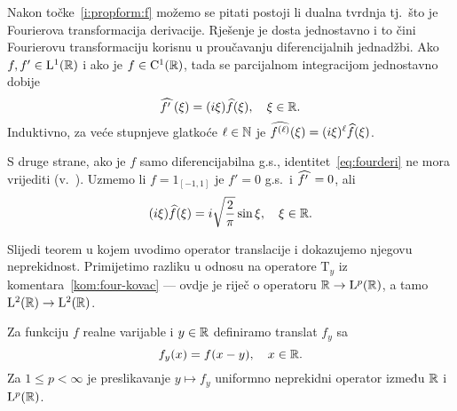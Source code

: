 \documentclass[main.tex]{subfiles}
\begin{document}
\begin{komentar}
	\newcommand{\fourderi}[1]{\wh{{#1}^{\prime\phantom{.}}  }}
	Nakon točke~\ref{i:propform:f} možemo se pitati postoji li dualna tvrdnja
	tj.\ što je Fourierova transformacija derivacije. Rješenje je dosta
	jednostavno i to čini Fourierovu transformaciju korisnu u proučavanju
	diferencijalnih jednadžbi. Ako \( f,f' \in \mathrm{L}^1(\mathbb{R}) \) i ako je \( f \in \mathrm C^1(\mathbb{R} )\),
	tada se parcijalnom integracijom jednostavno dobije
	\begin{equation}\label{eq:fourderi}
		\fourderi f (\xi) = (i\xi)\wh f(\xi), \quad \xi \in \R.
	\end{equation}
	Induktivno, za veće stupnjeve glatkoće \( \ell \in \mathbb{N} \)
	je \( \widehat{f^{(\ell)}}(\xi) = (i\xi)^\ell \widehat{f}(\xi)  \).

	S druge strane, ako je \( f \) samo diferencijabilna g.s., identitet~\eqref{eq:fourderi}
	ne mora vrijediti (v.~\cite[exercise~9.6]{rudin}). Uzmemo li \( f=1_{[-1,1]} \)
	je \( f'=0 \) g.s.\ i \( \fourderi f = 0 \), ali
	\begin{equation}
		(i\xi)\widehat{f}(\xi) = i\sqrt{\frac 2\pi} \sin \xi, \quad \xi \in \mathbb{R}.
	\end{equation}
\end{komentar}

Slijedi teorem u kojem uvodimo
operator translacije i dokazujemo njegovu neprekidnost.
Primijetimo razliku u odnosu na operatore \( \mathrm T_y \)
iz komentara~\ref{kom:four-kovac} --- ovdje je riječ o operatoru \( \mathbb{R} \to \mathrm{L}^p(\mathbb{R}) \),
a tamo \( \mathrm{L}^2(\mathbb{R}) \to \mathrm{L}^2(\mathbb{R}) \).

\begin{teorem}\label{tm:trans}
	Za funkciju \( f \) realne varijable i \( y \in \mathbb{R} \) definiramo
	translat \( f_y \) sa
	\begin{equation}
		f_y(x) = f(x-y), \quad x \in \mathbb{R}.
	\end{equation}
	Za  \( 1 \le p < \infty \) je preslikavanje \( y \mapsto f_y \)
	uniformno neprekidni operator između \( \mathbb{R} \) i \( \mathrm{L}^p(\mathbb{R}) \).
\end{teorem}
\end{document}
